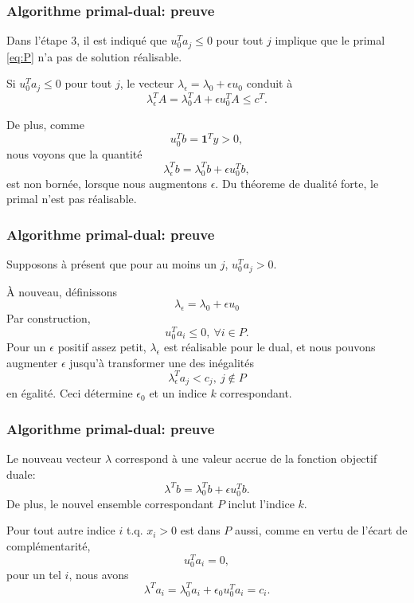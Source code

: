 \documentclass[t, aspectratio=169, usepdftitle=false]{beamer}
\def\bone{\boldsymbol{1}}
\begin{document}
\begin{frame}
\frametitle{Algorithme primal-dual: preuve}

Dans l'étape 3, il est indiqué que $u_0^T a_j \leq 0$ pour tout $j$ implique que le primal \eqref{eq:P} n'a pas de solution réalisable.

\mbox{}

Si $u_0^T a_j \leq 0$ pour tout $j$, le vecteur
$\lambda_{\epsilon} = \lambda_0 + \epsilon u_0$ conduit à
\[
\lambda_{\epsilon}^TA = \lambda_0^TA + \epsilon u_0^TA \leq c^T.
\]

\mbox{}

De plus, comme
\[
u_0^T b = \bone^T y > 0,
\]
nous voyons que la quantité
\[
\lambda_{\epsilon}^Tb = \lambda_0^Tb + \epsilon u_0^T b,
\]
est non bornée, lorsque nous augmentons $\epsilon$.
Du théoreme de dualité forte, le primal n'est pas réalisable.

\end{frame}

\begin{frame}
\frametitle{Algorithme primal-dual: preuve}

Supposons à présent que pour au moins un $j$, $u_0^T a_j > 0$.

\mbox{}

À nouveau, définissons
\[
\lambda_{\epsilon} = \lambda_0 + \epsilon u_0
\]
Par construction,
\[
u_0^T a_i \leq 0, \ \forall i \in P.
\]
Pour un $\epsilon$ positif assez petit, $\lambda_{\epsilon}$ est réalisable pour le dual, et nous pouvons augmenter $\epsilon$ jusqu'à transformer une des inégalités
\[
\lambda_{\epsilon}^T a_j < c_j,\ j \notin P
\]
en égalité.
Ceci détermine $\epsilon_0$ et un indice $k$ correspondant.

\end{frame}

\begin{frame}
\frametitle{Algorithme primal-dual: preuve}

Le nouveau vecteur $\lambda$ correspond à une valeur accrue de la fonction objectif duale:
\[
\lambda^T b = \lambda_0^T b + \epsilon u_0^T b.
\]
De plus, le nouvel ensemble correspondant $P$ inclut l'indice $k$.

\mbox{}

Pour tout autre indice $i$ t.q. $x_i > 0$ est dans $P$ aussi, comme en vertu de l'écart de complémentarité,
\[
u_0^T a_i = 0,
\]
pour un tel $i$, nous avons
\[
\lambda^T a_i = \lambda_0^T a_i + \epsilon_0 u_0^T a_i = c_i.
\]

\end{frame}
\end{document}
